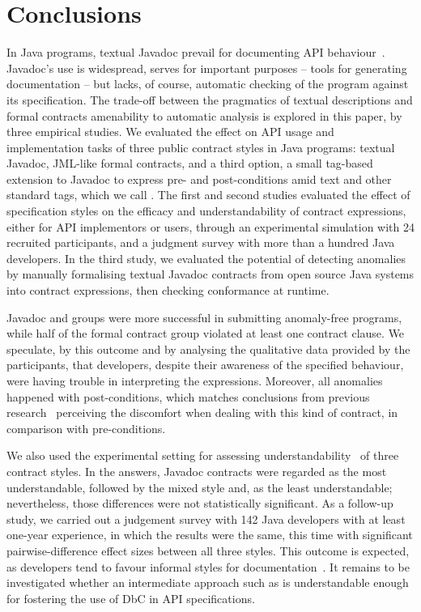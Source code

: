 \section{Conclusions}
\label{sec:conclusions}

In Java programs, textual Javadoc prevail for documenting API behaviour~\cite{docAnalysis}.
Javadoc's use is widespread, serves for important purposes -- tools for generating documentation -- but lacks, of course, automatic checking of the program against its specification.
The trade-off between the pragmatics of textual descriptions and formal contracts amenability to automatic analysis is explored in this paper, by three empirical studies.
We evaluated the effect on API usage and implementation tasks of three public contract styles in Java programs: textual Javadoc, JML-like formal contracts, and a third option, a small tag-based extension to Javadoc to express pre- and post-conditions amid text and other standard tags, which we call \contractjdoc{}.
The first and second studies evaluated the effect of specification styles on the efficacy and understandability of contract expressions, either for API implementors or users, through an experimental simulation with 24 recruited participants, and a judgment survey with more than a hundred Java developers.
In the third study, we evaluated the potential of detecting anomalies by manually formalising textual Javadoc contracts from open source Java systems into contract expressions, then checking conformance at runtime.


Javadoc and \contractjdoc{} groups were more successful in submitting anomaly-free programs, while half of the formal contract group violated at least one contract clause. 
We speculate, by this outcome and by analysing the qualitative data provided by the participants, that developers, despite their awareness of the specified behaviour, were having trouble in interpreting the expressions.  
Moreover, all anomalies happened with post-conditions, which matches conclusions from previous research~\cite{Estler-etal14,sac2017} perceiving the discomfort when dealing with this kind of contract, in comparison with pre-conditions. 


We also used the experimental setting for assessing understandability~\cite{Scalabrino2017} of three contract styles. 
In the answers, Javadoc contracts were regarded as the most understandable, followed by the mixed \contractjdoc{} style and, as the least understandable; nevertheless, those differences were not statistically significant. As a follow-up study, we carried out a judgement survey with 142 Java developers with at least one-year experience, in which the results were the same, this time with significant pairwise-difference effect sizes between all three styles.
This outcome is expected, as developers tend to favour informal styles for documentation~\cite{Polikarpova-etal09}. It remains to be investigated whether an intermediate approach such as \contractjdoc{} is understandable enough for fostering the use of DbC in API specifications.

